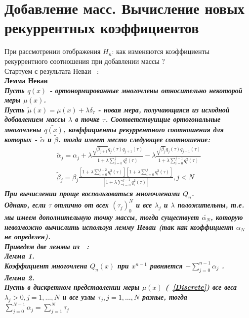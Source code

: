 \section{Добавление масс. Вычисление новых рекуррентных коэффициентов}

При рассмотрении отображения $H_n$: как изменяются коэффициенты
рекуррентного соотношения при добавлении массы ? \\
Стартуем с результата Неваи ~\cite{Nevai}: \\
\bf Лемма Неваи \rm \\
\it Пусть $q(x)$ - ортонормированные многочлены относительно некоторой меры
$\mu(x)$. \\
Пусть $\tilde{\mu}(x)=\mu(x)+\lambda \delta_{\tau}$ - новая мера, получающаяся из исходной
добавлением массы $\lambda$ в точке $\tau$.
Соответствуищие ортогональные многочлены
$\tilde{q(x)}$, коэффициенты рекуррентного соотношения для которых - $\tilde{\alpha}$ и $\tilde{\beta}$.
тогда имеет место следующее соотношение: \rm
\begin{eqnarray}
\label{Alpha}
\tilde{\alpha}_j=\alpha_j+
\lambda\frac{\sqrt{\beta_{j+1}} q_j(\tau)q_{j+1}(\tau)} { 1+ \lambda\sum\limits_{i=0}^{j}{q_i^2(\tau)}}-
\lambda\frac{\sqrt{\beta_{j}} q_j(\tau)q_{j-1}(\tau)} { 1+ \lambda\sum\limits_{i=0}^{j-1}{q_i^2(\tau)}} \\
\tilde{\beta}_j=\beta_j
\frac
{ \left[
1+ \lambda\sum\limits_{i=0}^{j-2}{q_i^2(\tau)}
\right]
\left[
1+ \lambda\sum\limits_{i=0}^{j}{q_i^2(\tau)}
\right] }
{
\left[
1+ \lambda\sum\limits_{i=0}^{j-1}{q_i^2(\tau)}
\right]
},j<N
\end{eqnarray}
При вычислении проще воспользоваться многочленами $Q_n$.  \\
Однако, если $\tau$ отлично от всех $(\tau_j)_0^{N}$ и все
$\lambda_j$ и $\lambda$ положительны, т.е.
мы имеем дополнительную точку массы, тогда
существует $\tilde{\alpha_{N}}$, которую невозможно вычислить
используя лемму Неваи (так как коэффициент $\alpha_N$ не определен). \\
Приведем две леммы из ~\cite{Fischer2}: \\
\bf Лемма 1. \rm \\
\it Коэффициент многочлена $Q_n(x)$ при $x^{n-1}$ равняется $-\sum\limits_{j=0}^{n-1}{\alpha_j}$ \rm. \\
\bf Лемма 2. \rm \\
\it Пусть в дискретном представлении меры $\mu(x)$ (~\ref{Discrete})
все веса $\lambda_j>0,j=1,\ldots,N$ и все узлы $\tau_j,j=1,\ldots,N$ разные,
тогда $\sum\limits_{j=0}^{N-1}{\alpha_j}=\sum\limits_{j=1}^{N}{\tau_j}$ \rm \\
